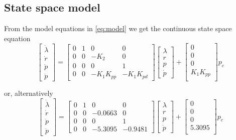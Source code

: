 \subsection{State space model}
From the model equations in \eqref{eq:model} we get the continuous state space equation
\begin{equation*}
	\begin{bmatrix}
		\dot{\lambda}\\
		\dot{r}\\
		\dot{p}\\
		\ddot{p}
	\end{bmatrix} = 
	\begin{bmatrix}
		0 & 1 & 0 & 0 \\
		0 & 0 & -K_2 & 0 \\
		0 & 0 & 0 & 1 \\
		0 & 0 & -K_1K_{pp} & -K_1K_{pd}
	\end{bmatrix}
	\begin{bmatrix}
		\lambda	\\
		r		\\
		p		\\
		\dot{p}
	\end{bmatrix} +
	\begin{bmatrix}
		0 \\
		0 \\
		0 \\
		K_1K_{pp} \\
	\end{bmatrix}
	p_c
\end{equation*}

or, alternatively
\begin{equation*}
	\begin{bmatrix}
		\dot{\lambda}\\
		\dot{r}\\
		\dot{p}\\
		\ddot{p}
	\end{bmatrix} = 
	\begin{bmatrix}
		0 & 1 & 0 & 0 \\
		0 & 0 & -0.0663 & 0 \\
		0 & 0 & 0 & 1 \\
		0 & 0 & -5.3095 & -0.9481
	\end{bmatrix}
	\begin{bmatrix}
		\lambda	\\
		r		\\
		p		\\
		\dot{p}
	\end{bmatrix} +
	\begin{bmatrix}
		0 \\
		0 \\
		0 \\
		5.3095 \\
	\end{bmatrix}
	p_c
\end{equation*}

